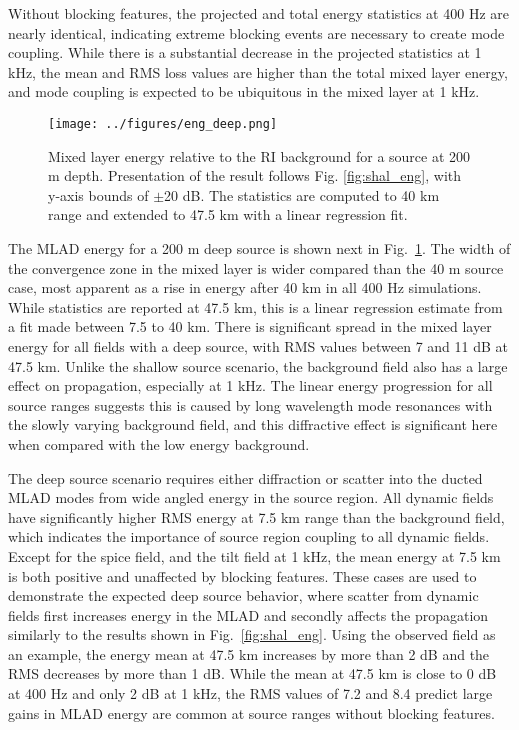 \documentclass[preprint,NumberedRefs]{JASA}
\begin{document}
Without blocking features, the projected and total energy statistics at 400 Hz are nearly identical, indicating extreme blocking events are necessary to create mode coupling. While there is a substantial decrease in the projected statistics at 1 kHz, the mean and RMS loss values are higher than the total mixed layer energy, and mode coupling is expected to be ubiquitous in the mixed layer at 1 kHz.

\begin{figure}
\texttt{[image: ../figures/eng\_deep.png]}
    \caption{Mixed layer energy relative to the RI background for a source at 200 m depth. Presentation of the result follows Fig. \ref{fig:shal_eng}, with y-axis bounds of $\pm$20 dB. The statistics are computed to 40 km range and extended to 47.5 km with a linear regression fit.}
    \label{fig:deep_eng}
\end{figure}
The MLAD energy for a 200 m deep source is shown next in Fig.~\ref{fig:deep_eng}. The width of the convergence zone in the mixed layer is wider compared than the 40 m source case, most apparent as a rise in energy after 40 km in all 400 Hz simulations. While statistics are reported at 47.5 km, this is a linear regression estimate from a fit made between 7.5 to 40 km. There is significant spread in the mixed layer energy for all fields with a deep source, with RMS values between 7 and 11 dB at 47.5 km. Unlike the shallow source scenario, the background field also has a large effect on propagation, especially at 1 kHz. The linear energy progression for all source ranges suggests this is caused by long wavelength mode resonances with the slowly varying background field\cite{colosi21}, and this diffractive effect is significant here when compared with the low energy background.

The deep source scenario requires either diffraction or scatter into the ducted MLAD modes from wide angled energy in the source region. All dynamic fields have significantly higher RMS energy at 7.5 km range than the background field, which indicates the importance of source region coupling to all dynamic fields. Except for the spice field, and the tilt field at 1 kHz, the mean energy at 7.5 km is both positive and unaffected by blocking features. These cases are used to demonstrate the expected deep source behavior, where scatter from dynamic fields first increases energy in the MLAD and secondly affects the propagation similarly to the results shown in Fig.~\ref{fig:shal_eng}. Using the observed field as an example, the energy mean at 47.5 km increases by more than 2 dB and the RMS decreases by more than 1 dB. While the mean at 47.5 km is close to 0 dB at 400 Hz and only 2 dB at 1 kHz, the RMS values of 7.2 and 8.4 predict large gains in MLAD energy are common at source ranges without blocking features.
\end{document}
